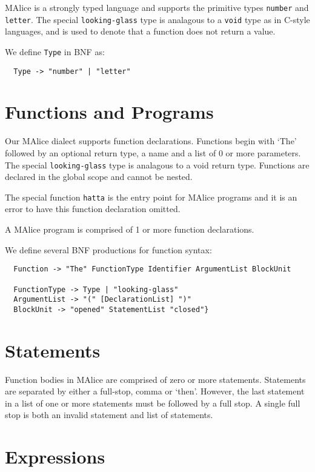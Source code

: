 \documentclass[a4wide, 11pt]{article}
\begin{document}
MAlice is a strongly typed language and supports the primitive types \texttt{number} and \texttt{letter}. The special \texttt{looking-glass} type is analagous to a \texttt{void} type as in C-style languages, and is used to denote that a function does not return a value.

We define \texttt{Type} in BNF as:
\begin{verbatim}
  Type -> "number" | "letter"
\end{verbatim}

\section{Functions and Programs}

Our MAlice dialect supports function declarations. Functions begin with `The' followed by an optional return type, a name and a list of 0 or more parameters. The special \texttt{looking-glass} type is analagous to a void return type. Functions are declared in the global scope and cannot be nested.

The special function \texttt{hatta} is the entry point for MAlice programs and it is an error to have this function declaration omitted.

A MAlice program is comprised of 1 or more function declarations.

We define several BNF productions for function syntax:
\begin{verbatim}
  Function -> "The" FunctionType Identifier ArgumentList BlockUnit

  FunctionType -> Type | "looking-glass"
  ArgumentList -> "(" [DeclarationList] ")"
  BlockUnit -> "opened" StatementList "closed"}
\end{verbatim}

\section{Statements}

Function bodies in MAlice are comprised of zero or more statements. Statements are separated by either a full-stop, comma or `then'. However, the last statement in a list of one or more statements must be followed by a full stop. A single full stop is both an invalid statement and list of statements.
  
\section{Expressions}
\end{document}
